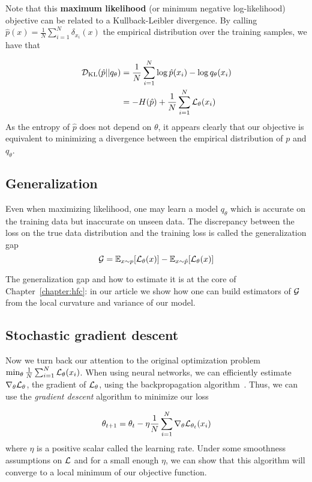 Note that this \textbf{maximum likelihood} (or minimum negative log-likelihood) objective can be related to a Kullback-Leibler divergence. By calling $\hat{p}(x) = \frac{1}{N} \sum_{i=1}^N \delta_{x_i}(x)$ the empirical distribution over the training samples, we have that

\begin{align*}
{\mathcal{D}}_{\mathrm{KL}}(\hat{p}||q_\theta) &= \frac{1}{N} \sum_{i=1}^N \log \hat{p}(x_i) - \log q_\theta(x_i) \\
&= - H(\hat{p}) +  \frac{1}{N} \sum_{i=1}^N {\mathcal{L}}_\theta(x_i)\\
\end{align*}
As the entropy of $\hat{p}$ does not depend on $\theta$, it appears clearly that our objective is equivalent to minimizing a divergence between the empirical distribution of $p$ and $q_\theta$.

\subsection{Generalization}
Even when maximizing likelihood, one may learn a model $q_\theta$ which is accurate on the training data but inaccurate on unseen data. %
The discrepancy between the loss on the true data distribution and the training loss is called the generalization gap
$${\mathcal{G}} = \mathbb{E}_{x\sim p}[{\mathcal{L}}_\theta(x)] -\mathbb{E}_{x\sim \hat{p}}[{\mathcal{L}}_\theta(x)]$$


The generalization gap and how to estimate it is at the core of Chapter~\ref{chapter:hfc}: in our article we show how one can build estimators of ${\mathcal{G}}$ from the local curvature and variance of our model. 

\subsection{Stochastic gradient descent}
Now we turn back our attention to the original optimization problem $\min_\theta
\frac{1}{N} \sum_{i=1}^N {\mathcal{L}}_\theta(x_i)$. When using neural networks, we can
efficiently estimate $\nabla_\theta {\mathcal{L}}_\theta$, the gradient of ${\mathcal{L}}_\theta$, using the backpropagation algorithm~\citep{rumelhart1986learning}. Thus, we can use the \emph{gradient descent} algorithm to minimize our loss

\begin{equation}
\label{eq:gradient_descent}
    \theta_{t+1} = \theta_t - \eta \frac{1}{N} \sum_{i=1}^N \nabla_\theta {\mathcal{L}}_{\theta_t}(x_i)
\end{equation}
where $\eta$ is a positive scalar called the learning rate. Under some smoothness assumptions on ${\mathcal{L}}$ and for a small enough $\eta$, we can show that this algorithm will converge to a local minimum of our objective function.

